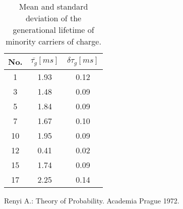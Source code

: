 \begin{table}[h!]\centering
  \begin{tabular}{c c c}
    No. & ${\bar{\tau_{g}}}[ms]$ & $\delta\tau_{g}[ms]$\\
    \hline
    1 & 1.93 & 0.12\\
    3 & 1.48 & 0.09\\
    5 & 1.84 & 0.09\\
    7 & 1.67 & 0.10\\
    10 & 1.95 & 0.09\\
    12 & 0.41 & 0.02\\
    15 & 1.74 & 0.09\\
    17 & 2.25 & 0.14\\
  \end{tabular}
  \caption[Mean and standard deviation of generation time of life of
    minority carriers of charge]{Mean and standard deviation of the
    generational lifetime of minority carriers of
    charge.}\label{tab:7.6}
\end{table}


\begin{thebibliography}{}
  Renyi A.: Theory of Probability. Academia Prague 1972.
\end{thebibliography}
